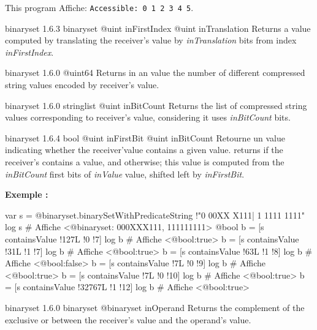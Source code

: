 This program Affiche: \texttt{Accessible: 0 1 2 3 4 5}.




{binaryset}
{1.6.3}
{binaryset}
{@uint inFirstIndex}
{@uint inTranslation}
{Returns a  value computed by translating the receiver's value by \emph{inTranslation} bits from index \emph{inFirstIndex}.}
{}



{binaryset}
{1.6.0}
{@uint64}
{Returns in an  value the number of different compressed string values encoded by receiver's value.}
{}




{binaryset}
{1.6.0}
{stringlist}
{@uint inBitCount}
{Returns the list of compressed string values corresponding to receiver's value, considering it uses \emph{inBitCount} bits.}
{}










{binaryset}
{1.6.4}
{bool}
{@uint inFirstBit}
{@uint inBitCount}
{Retourne un  value indicating whether the receiver'value contains a given value.}
{returns  if the receiver's contains a value, and  otherwise; this value is computed from the \emph{inBitCount} first bits of \emph{inValue} value, shifted left by \emph{inFirstBit}.}


\textbf{Exemple :}
\begin{galgascode}
var s = @binaryset.binarySetWithPredicateString {!"0 00XX X111| 1 1111 1111"}
log s # Affiche <@binaryset: 000XXX111, 111111111>
@bool b = [s containsValue !127L !0 !7]
log b # Affiche <@bool:true>
b = [s containsValue !31L !1 !7]
log b # Affiche <@bool:true>
b = [s containsValue !63L !1 !8]
log b # Affiche <@bool:false>
b = [s containsValue !7L !0 !9]
log b # Affiche <@bool:true>
b = [s containsValue !7L !0 !10]
log b # Affiche <@bool:true>
b = [s containsValue !32767L !1 !12]
log b # Affiche <@bool:true>
\end{galgascode}








{binaryset}
{1.6.0}
{binaryset}
{@binaryset inOperand}
{Returns the complement of the exclusive or between the receiver's value and the operand's value.}
{}

